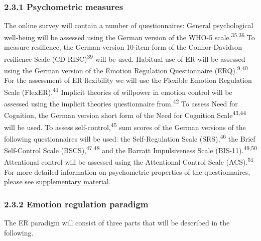 \documentclass[
  english,
  man,floatsintext]{apa6}
\begin{document}
\hypertarget{psychometric-measures}{%
\subsubsection{2.3.1 Psychometric measures}\label{psychometric-measures}}

The online survey will contain a number of questionnaires: General psychological well-being will be assessed using the German version of the WHO-5 scale.\textsuperscript{35,36}
To measure resilience, the German version 10-item-form of the Connor-Davidson resilience Scale (CD-RISC)\textsuperscript{39} will be used.
Habitual use of ER will be assessed using the German version of the Emotion Regulation Questionnaire (ERQ).\textsuperscript{9,40}
For the assessment of ER flexibility we will use the Flexible Emotion Regulation Scale (FlexER).\textsuperscript{41}
Implicit theories of willpower in emotion control will be assessed using the implicit theories questionnaire from.\textsuperscript{42}
To assess Need for Cognition, the German version short form of the Need for Cognition Scale\textsuperscript{43,44} will be used.
To assess self-control,\textsuperscript{45} sum scores of the German versions of the following questionnaires will be used: the Self-Regulation Scale (SRS),\textsuperscript{46} the Brief Self-Control Scale (BSCS),\textsuperscript{47,48} and the Barratt Impulsiveness Scale (BIS-11).\textsuperscript{49,50}
Attentional control will be assessed using the Attentional Control Scale (ACS).\textsuperscript{51}
For more detailed information on psychometric properties of the questionnaires, please see \protect\hyperlink{SupplementQuestionnaires}{supplementary material}.

\hypertarget{emotion-regulation-paradigm}{%
\subsubsection{2.3.2 Emotion regulation paradigm}\label{emotion-regulation-paradigm}}

The ER paradigm will consist of three parts that will be described in the following.
\end{document}
